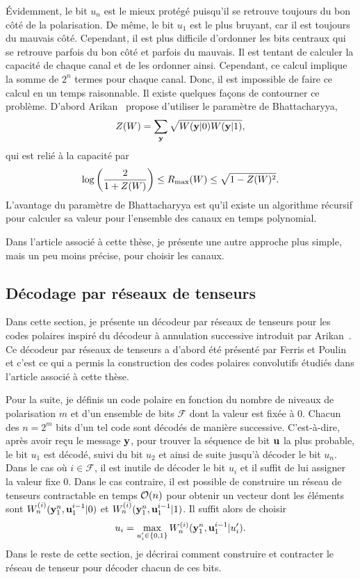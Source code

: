 Évidemment, le bit $u_n$ est le mieux protégé puisqu'il se retrouve
toujours du bon côté de la polarisation. 
De même, 
le bit $u_1$ est le plus bruyant, car il est toujours du mauvais côté.
Cependant, 
il est plus difficile d'ordonner les bits centraux qui se retrouve parfois du bon côté
et parfois du mauvais.
Il est tentant de calculer la capacité de chaque canal et de les ordonner
ainsi.
Cependant, ce calcul implique la somme de $2^n$ termes pour chaque canal. 
Donc, il est impossible de faire ce calcul en un temps raisonnable.
Il existe quelques façons de contourner ce problème.
D'abord Arikan~\cite{arikan_channel_2009} propose d'utiliser le paramètre de Bhattacharyya,
\begin{equation}
  Z(W) = \sum_{\vb y} \sqrt{W(\vb y|0)W(\vb y|1)},
\end{equation}
qui est relié à la capacité par
\begin{equation}
  \log\qty( \frac{2}{1 + Z(W)} )
  \leq  
  R_{\text{max}}(W) 
  \leq 
  \sqrt{1 - Z(W)^2} .
\end{equation}
L'avantage du paramètre de Bhattacharyya est qu'il existe un algorithme récursif pour
calculer sa valeur pour l'ensemble des canaux en temps polynomial.

Dans l'article associé à cette thèse, 
je présente une autre approche plus simple, 
mais un peu moins précise, 
pour choisir les canaux.

\subsection{Décodage par réseaux de tenseurs}

Dans cette section,
je présente un décodeur par réseaux de tenseurs pour les codes polaires 
inspiré du décodeur à annulation successive introduit par Arikan~\cite{arikan_channel_2009}.
Ce décodeur par réseaux de tenseurs a d'abord été présenté par Ferris 
et Poulin~\cite{ferris_branching_2014} et c'est ce qui a permis
la construction des codes polaires convolutifs étudiés dans l'article associé à cette thèse.

Pour la suite, 
je définis un code polaire en fonction du nombre de niveaux de polarisation $m$
et d'un ensemble de bits $\mathcal F$ dont la valeur est fixée à 0.
Chacun des $n = 2^m$ bits d'un tel code sont décodés de manière successive.
C'est-à-dire, 
après avoir reçu le message $\vb y$,
pour trouver la séquence de bit $\vb u$ la plus probable,
le bit $u_1$ est décodé, suivi du bit $u_2$ et ainsi de suite jusqu'à décoder le bit $u_n$.
Dans le cas où $i \in \mathcal F$, 
il est inutile de décoder le bit $u_i$ et il suffit de lui assigner la valeur fixe $0$.
Dans le cas contraire,
il est possible de construire un réseau de tenseurs contractable en temps $\mathcal{O}(n)$
pour obtenir un vecteur dont les éléments sont $W_n^{(i)}(\vb y_1^n, \vb u_1^{i-1} | 0)$
et $W_n^{(i)}(\vb y_1^n, \vb u_1^{i-1} | 1)$.
Il suffit alors de choisir 
\begin{equation}
  u_i = \max_{u_i' \in \qty{0,1}} W_n^{(i)}(\vb y_1^n, \vb u_1^{i-1} | u_i').
\end{equation}
Dans le reste de cette section,
je décrirai comment construire et contracter le réseau de tenseur
pour décoder chacun de ces bits.


